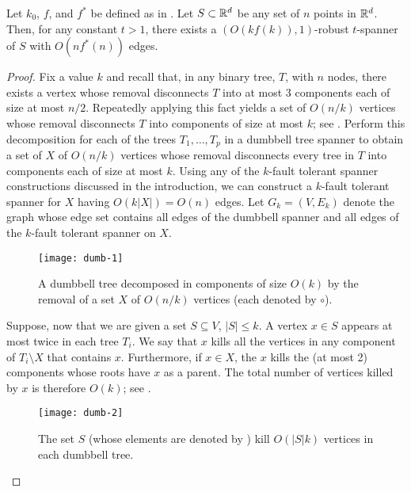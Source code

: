 \documentclass{patmorin}
\begin{document}
\begin{thm}
Let $k_0$, $f$, and $f^*$ be defined as in .
Let $S\subset \mathbb{R}^d$ be any set of $n$ points in $\mathbb{R}^d$.  Then, for any
constant $t>1$,  there exists a $(O(kf(k)),1)$-robust $t$-spanner of $S$
with $O(nf^*(n))$ edges.
\end{thm}

\begin{proof} 

Fix a value $k$ and recall that, in any binary tree, $T$, with $n$
nodes, there exists a vertex whose removal disconnects $T$ into at most 3
components each of size at most $n/2$.  Repeatedly applying this
fact yields a set of $O(n/k)$ vertices whose removal disconnects $T$ into
components of size at most $k$; see .  Perform this decomposition for each of
the trees $T_1,\ldots,T_p$ in a dumbbell tree spanner to obtain a set of
$X$ of $O(n/k)$ vertices whose removal disconnects every tree in $T$ into
components each of size at most $k$.  Using any of the $k$-fault tolerant
spanner constructions discussed in the introduction, we can construct
a $k$-fault tolerant spanner for $X$ having $O(k|X|)=O(n)$ edges.
Let $G_k=(V,E_k)$ denote the graph whose edge set contains all edges of the
dumbbell spanner and all edges of the $k$-fault tolerant spanner on $X$.

\begin{figure}
\begin{center}
  \texttt{[image: dumb-1]}
\end{center}
\caption{A dumbbell tree decomposed in components of size $O(k)$ by the
removal of a set $X$ of $O(n/k)$ vertices (each denoted by $\circ$).}
\end{figure}

Suppose, now that we are given a set $S\subseteq V$, $|S|\le k$.  A vertex
$x\in S$ appears at most twice in each tree $T_i$.  We say that $x$ kills
all the vertices in any component of $T_i\setminus X$ that contains $x$.
Furthermore, if $x\in X$, the $x$ kills the (at most 2) components whose
roots have $x$ as a parent.  The total number of vertices killed by $x$
is therefore $O(k)$; see .

\begin{figure}
\begin{center}
  \texttt{[image: dumb-2]}
\end{center}
\caption{The set $S$ (whose elements are denoted by \textbullet) kill
$O(|S|k)$ vertices in each dumbbell tree.}
\end{figure}


\end{proof}
\end{document}
